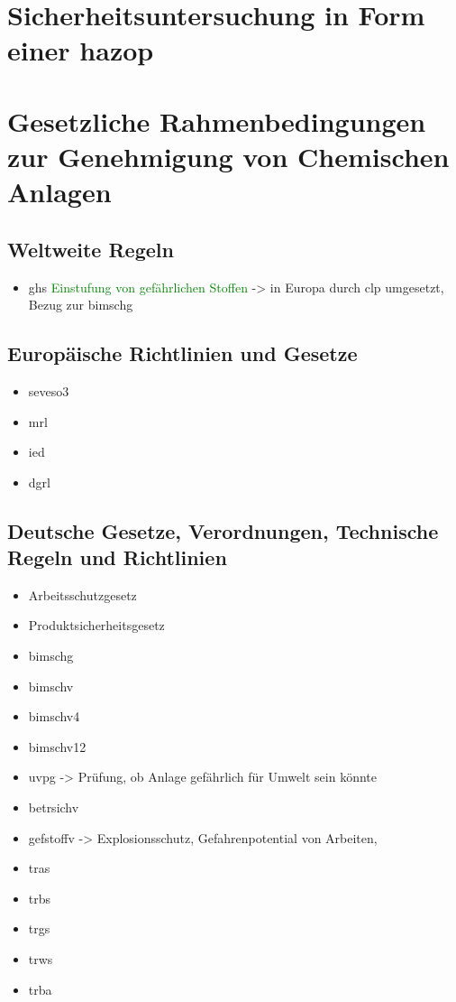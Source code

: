 \section{Sicherheitsuntersuchung in Form einer \ac{hazop}}
\section{Gesetzliche Rahmenbedingungen zur Genehmigung von Chemischen Anlagen}
\subsection{Weltweite Regeln}
\begin{itemize}
\item \ac{ghs} \textcolor{green}{Einstufung von gef\"ahrlichen Stoffen} -> in Europa durch \ac{clp} umgesetzt, Bezug zur \ac{bimschg}
\end{itemize}
\subsection{Europ\"aische Richtlinien und Gesetze}
\begin{itemize}
\item \ac{seveso3}
\item \ac{mrl}
\item \ac{ied}
\item \ac{dgrl}
\end{itemize}
\subsection{Deutsche Gesetze, Verordnungen, Technische Regeln und Richtlinien}
\begin{itemize}
\item Arbeitsschutzgesetz
\item Produktsicherheitsgesetz
\item \ac{bimschg}
\item \ac{bimschv}
\item \ac{bimschv4}
\item \ac{bimschv12}
\item \ac{uvpg} -> Pr\"ufung, ob Anlage gef\"ahrlich f\"ur Umwelt sein k\"onnte
\item \ac{betrsichv}
\item \ac{gefstoffv} -> Explosionsschutz, Gefahrenpotential von Arbeiten, 
\item \ac{tras}
\item \ac{trbs}
\item \ac{trgs}
\item \ac{trws}
\item \ac{trba}
\end{itemize}
